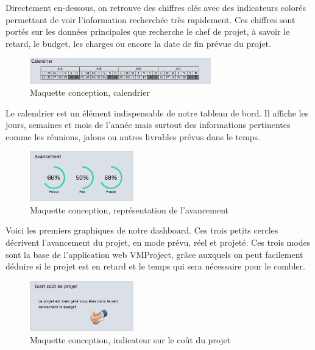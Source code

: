 \documentclass[12pt]{report}
\begin{document}
Directement en-dessous, on retrouve des chiffres clés avec des indicateurs colorés permettant de voir l'information recherchée très rapidement. Ces chiffres sont portés sur les données principales que recherche le chef de projet, à savoir le retard, le budget, les charges ou encore la date de fin prévue du projet.\\

\begin{figure}[H]
	\centering
	\includegraphics[width=0.7\textwidth]{pictures/notreMaquette/calendrier.jpg}
	\caption{Maquette conception, calendrier}
	\label{7}
\end{figure}

Le calendrier est un élément indispensable de notre tableau de bord. Il affiche les jours, semaines et mois de l'année mais surtout des informations pertinentes comme les réunions,  jalons ou autres livrables prévus dans le temps.\\

\begin{figure}[H]
	\centering
	\includegraphics[width=0.4\textwidth]{pictures/notreMaquette/avancement.jpg}
	\caption{Maquette conception, représentation de l'avancement}
	\label{8}
\end{figure}

Voici les premiers graphiques de notre dashboard. Ces trois petits cercles décrivent l'avancement du projet, en mode prévu, réel et projeté. Ces trois modes sont la base de l'application web VMProject, grâce auxquels on peut facilement déduire si le projet est en retard et le temps qui sera nécessaire pour le combler.\\

\begin{figure}[H]
	\centering
	\includegraphics[width=0.4\textwidth]{pictures/notreMaquette/indicateur.jpg}
	\caption{Maquette conception, indicateur sur le coût du projet}
	\label{9}
\end{figure}
\end{document}
